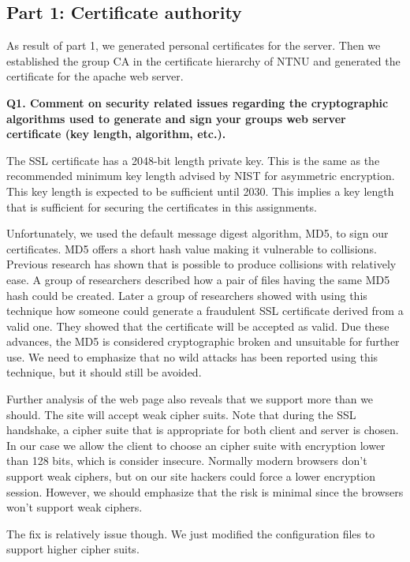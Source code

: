 
\subsection {Part 1: Certificate authority}

As result of part 1, we generated personal certificates for the server. Then we established the group CA in the certificate hierarchy of NTNU and generated the certificate for the apache web server. 
\newline

\noindent
{\bf Q1. Comment on security related issues regarding the cryptographic algorithms used to generate and sign your groups web server certificate (key length, algorithm, etc.).}
\newline

\noindent
The SSL certificate has a 2048-bit length private key. This is the same as the recommended minimum key length advised by NIST for asymmetric encryption. This key length is expected to be sufficient until 2030. \cite{nisc}This implies a key length that is sufficient for securing the certificates in this assignments. 
\newline

\noindent
Unfortunately, we used the default message digest algorithm, MD5, to sign our certificates. MD5 offers a short hash value making it vulnerable to collisions. Previous research has shown that is possible to produce collisions with relatively ease. A group of researchers described how a pair of files having the same MD5 hash could be created. Later a group of researchers showed with using this technique how someone could generate a fraudulent SSL certificate derived from a valid one. They showed that the certificate will be accepted as valid. Due these advances, the MD5 is considered cryptographic broken and unsuitable for further use. We need to emphasize that no wild attacks has been reported using this technique, but it should still be avoided. \cite {md5Wiki, md5Networking}
\newline

\noindent
Further analysis of the web page also reveals that we support more than we should. The site will accept weak cipher suits. Note that during the SSL handshake, a cipher suite that is appropriate for both client and server is chosen. In our case we allow the client to choose an cipher suite with encryption lower than 128 bits, which is consider insecure. Normally modern browsers don't support weak ciphers, but on our site hackers could force a lower encryption session. However, we should emphasize that the risk is minimal since the browsers won't support weak ciphers. \cite {cipher}
\newline

\noindent
The fix is relatively issue though. We just modified the configuration files to support higher cipher suits.  





